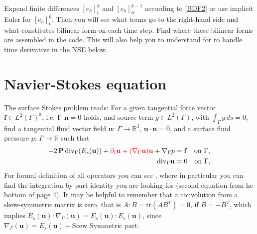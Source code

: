\documentclass{article}
\newcommand{\R}{\mathbb R}
\newcommand{\bP}{\mathbf P}
\newcommand{\blf}{\mathbf f}
\newcommand{\bn}{\mathbf n}
\newcommand{\bu}{\mathbf u}
\newcommand{\divG}{{\mathop{\,\rm div}}_{\Gamma}}
\begin{document}
{\color{blue} Expend finite differences $[c_h]_t^{k}$ and $\left[{c}_h\right]_{tt}^{k-1}$ according to \eqref{BDF2} or use implicit Euler for $[c_h]_t^{k}$. Then you will see what terms go to the right-hand side and what constitutes bilinear form on each time step. Find where these bilinear forms are assembled in the code.
This will also  help you to understand for to handle time derivative in the NSE below.}

\newpage
\section{Navier-Stokes equation}


The surface Stokes problem reads: For a given tangential force vector $\mathbf{f} \in L^2(\Gamma)^3$, i.e. $\mathbf{f}\cdot\bn=0$ holds, and
source term $g\in L^2(\Gamma)$, with $\int_\Gamma g\, ds=0$, find a tangential fluid vector field $\bu:\, \Gamma \to \R^3$, $\bu\cdot\bn =0$, and a surface fluid pressure $p:\, \Gamma \to \R$  such that
\begin{align} %
  - 2\,\bP \divG (E_s(\bu))+{\color{red}\partial_t\mathbf{u}+ (\nabla_\Gamma \mathbf{u})\mathbf{u}} +\nabla_\Gamma p &=  \blf \quad \text{on}~\Gamma,  \label{strongform-1} \\
  \divG \bu & =0 \quad \text{on}~\Gamma, \label{strongform-2}
\end{align}
{\color{blue} For formal definition of all operators you can see \cite{jankuhn2018incompressible}, where in particular you can find the integration by part identity you are looking for (second equation from he bottom of page 4). It may be helpful to remember that a convolution from a skew-symmetric matrix is zero, that is $A:B=\mbox{tr}(AB^T)=0$, if $B=-B^T$, which implies $E_s(\bu):\nabla_\Gamma(\bu)= E_s(\bu):E_s(\bu)$, since $\nabla_\Gamma(\bu)=E_s(\bu)+\text{Scew Symmetric part}$.\\}

\end{document}

